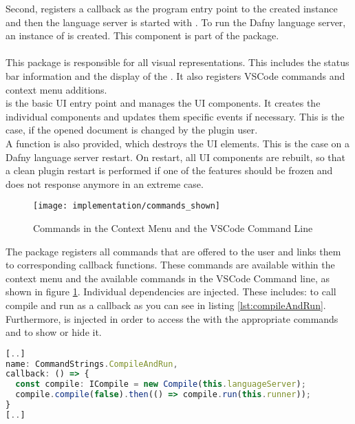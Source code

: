 Second,  registers a callback as the program entry point to the created \linebreak
{} instance and then the language server is started with .
To run the Dafny language server, an instance of  is created.
This component is part of the  package.\\

\textbf{}\\
This package is responsible for all visual representations.
This includes the status bar information and the display of the .
It also registers VSCode commands and context menu additions. \\

 is the basic UI entry point and manages the UI components.
It creates the individual components and updates them specific events if necessary.
This is the case, if the opened document is changed by the plugin user.\\

A  function is also provided, which destroys the UI elements. This is the case
on a Dafny language server restart. On restart, all UI components are rebuilt, 
so that a clean plugin restart is performed if one of the features should
be frozen and does not response anymore in an extreme case.\\

\begin{figure}[H]
    \centering
    \texttt{[image: implementation/commands\_shown]}
    \caption{Commands in the Context Menu and the VSCode Command Line}
    \label{fig:commands_shown}
\end{figure}

The  package registers all commands that are offered to the user
and links them to corresponding callback functions.
These commands are available within the context menu
and the available commands in the VSCode Command line, as shown in figure \ref{fig:commands_shown}.
Individual dependencies are injected. These includes:
 to call compile and run as a callback as you can see in listing \ref{lst:compileAndRun}.
Furthermore,  is injected
in order to access the  with the appropriate commands and to show or hide it.

\begin{lstlisting}[language=typescript, caption={Excerpt from \code{commands.ts}}, captionpos=b, label={lst:compileAndRun}]
[..]
name: CommandStrings.CompileAndRun,
callback: () => {
  const compile: ICompile = new Compile(this.languageServer);
  compile.compile(false).then(() => compile.run(this.runner));
}
[..]
\end{lstlisting}

